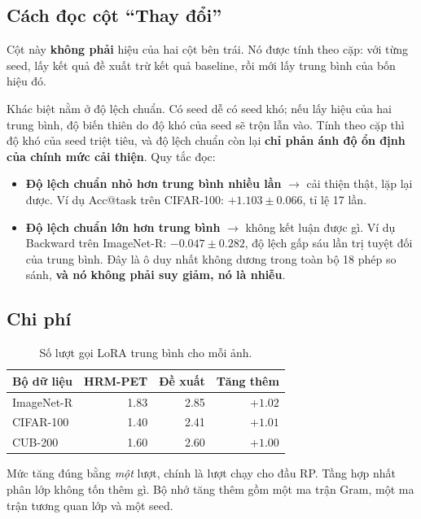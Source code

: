 \documentclass[11pt,a4paper]{article}
\begin{document}
\subsection{Cách đọc cột ``Thay đổi''}

Cột này \textbf{không phải} hiệu của hai cột bên trái. Nó được tính theo cặp: với
từng seed, lấy kết quả đề xuất trừ kết quả baseline, rồi mới lấy trung bình của
bốn hiệu đó.

Khác biệt nằm ở độ lệch chuẩn. Có seed dễ có seed khó; nếu lấy hiệu của hai trung
bình, độ biến thiên do độ khó của seed sẽ trộn lẫn vào. Tính theo cặp thì độ khó
của seed triệt tiêu, và độ lệch chuẩn còn lại \textbf{chỉ phản ánh độ ổn định của
chính mức cải thiện}. Quy tắc đọc:

\begin{itemize}
\item \textbf{Độ lệch chuẩn nhỏ hơn trung bình nhiều lần} $\rightarrow$ cải thiện
      thật, lặp lại được. Ví dụ Acc@task trên CIFAR-100: $+1.103 \pm 0.066$, tỉ
      lệ 17 lần.
\item \textbf{Độ lệch chuẩn lớn hơn trung bình} $\rightarrow$ không kết luận được
      gì. Ví dụ Backward trên ImageNet-R: $-0.047 \pm 0.282$, độ lệch gấp sáu lần
      trị tuyệt đối của trung bình. Đây là ô duy nhất không dương trong toàn bộ
      18 phép so sánh, \textbf{và nó không phải suy giảm, nó là nhiễu}.
\end{itemize}

\subsection{Chi phí}

\begin{table}[htbp]
\centering
\caption{Số lượt gọi LoRA trung bình cho mỗi ảnh.}
\begin{tabular}{lrrr}
\toprule
Bộ dữ liệu & HRM-PET & Đề xuất & Tăng thêm \\
\midrule
ImageNet-R & 1.83 & 2.85 & $+1.02$ \\
CIFAR-100  & 1.40 & 2.41 & $+1.01$ \\
CUB-200    & 1.60 & 2.60 & $+1.00$ \\
\bottomrule
\end{tabular}
\end{table}

Mức tăng đúng bằng \emph{một} lượt, chính là lượt chạy cho đầu RP. Tầng hợp nhất
phân lớp không tốn thêm gì. Bộ nhớ tăng thêm gồm một ma trận Gram, một ma trận
tương quan lớp và một seed.
\end{document}
